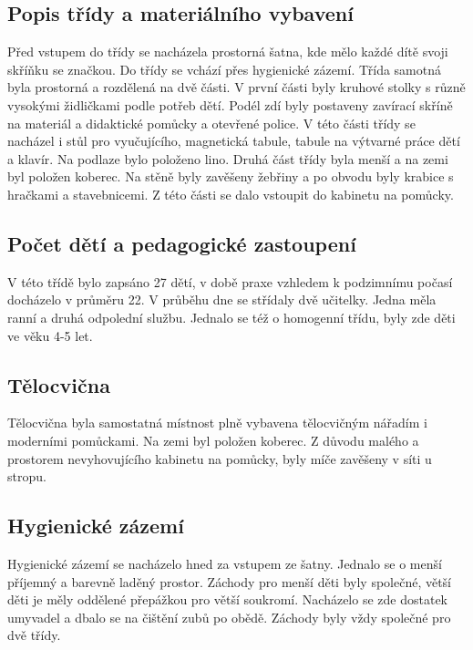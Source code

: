 
		\subsection{Popis třídy a materiálního vybavení}

			Před vstupem do třídy se nacházela prostorná šatna, kde mělo každé dítě svoji skříňku se značkou. Do třídy se vchází přes hygienické zázemí. Třída samotná byla prostorná a rozdělená na dvě části. V první části byly kruhové stolky s různě vysokými židličkami podle potřeb dětí. Podél zdí byly postaveny zavírací skříně na materiál a didaktické pomůcky a otevřené police. V této části třídy se nacházel i stůl pro vyučujícího, magnetická tabule, tabule na výtvarné práce dětí a klavír. Na podlaze bylo položeno lino. Druhá část třídy byla menší a na zemi byl položen koberec. Na stěně byly zavěšeny žebřiny a po obvodu byly krabice s hračkami a stavebnicemi. Z této části se dalo vstoupit do kabinetu na pomůcky.

		\subsection{Počet dětí a pedagogické zastoupení}

			V této třídě bylo zapsáno 27 dětí, v době praxe vzhledem k podzimnímu počasí docházelo v průměru 22. V průběhu dne se střídaly dvě učitelky. Jedna měla ranní a druhá odpolední službu.
			Jednalo se též o homogenní třídu, byly zde děti ve věku 4-5 let.
		
		\subsection{Tělocvična}
			Tělocvična byla samostatná místnost plně vybavena tělocvičným nářadím i moderními pomůckami. Na zemi byl položen koberec. Z důvodu malého a prostorem nevyhovujícího kabinetu na pomůcky,  byly míče zavěšeny v síti u stropu.

		\subsection{Hygienické zázemí}
			Hygienické zázemí se nacházelo hned za vstupem ze šatny. Jednalo se o menší příjemný a barevně laděný prostor. Záchody pro menší děti byly společné, větší děti je měly oddělené přepážkou pro větší soukromí. Nacházelo se zde dostatek umyvadel a dbalo se na čištění zubů po obědě. Záchody byly vždy společné pro dvě třídy. 

